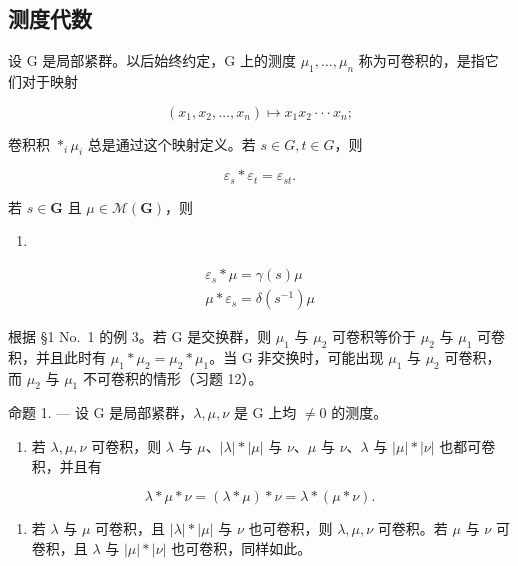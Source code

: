 \subsection{测度代数}

设 G 是局部紧群。以后始终约定，G 上的测度 \(\mu_{1},\ldots,\mu_{n}\) 称为可卷积的，是指它们对于映射

\[
(x _ {1}, x _ {2}, \ldots , x _ {n}) \mapsto x _ {1} x _ {2} \cdot \cdot \cdot x _ {n};
\]

卷积积 \(\ast_{i}\mu_{i}\) 总是通过这个映射定义。若 \(s\in G, t\in G\)，则

\[
\varepsilon_ {s} * \varepsilon_ {t} = \varepsilon_ {s t}.\tag{1}
\]

若 \(s \in \mathbf{G}\) 且 \(\mu \in \mathcal{M}(\mathbf{G})\)，则

\begin{enumerate}
\def\labelenumi{(\arabic{enumi})}
\setcounter{enumi}{1}
\tightlist
\item
\end{enumerate}

\[
\begin{array}{l} \varepsilon_ {s} * \mu = \gamma (s) \mu \\ \mu * \varepsilon_ {s} = \delta (s ^ {- 1}) \mu \end{array}\tag{3}
\]

根据 §1 No.~1 的例 3。若 G 是交换群，则 \(\mu_{1}\) 与 \(\mu_{2}\) 可卷积等价于 \(\mu_{2}\) 与 \(\mu_{1}\) 可卷积，并且此时有 \(\mu_{1} * \mu_{2} = \mu_{2} * \mu_{1}\)。当 G 非交换时，可能出现 \(\mu_{1}\) 与 \(\mu_{2}\) 可卷积，而 \(\mu_{2}\) 与 \(\mu_{1}\) 不可卷积的情形（习题 12）。

命题 1. --- 设 G 是局部紧群，\(\lambda, \mu, \nu\) 是 G 上均 \(\neq 0\) 的测度。

\begin{enumerate}
\def\labelenumi{(\roman{enumi})}
\tightlist
\item
  若 \(\lambda, \mu, \nu\) 可卷积，则 \(\lambda\) 与 \(\mu\)、\(|\lambda| * |\mu|\) 与 \(\nu\)、\(\mu\) 与 \(\nu\)、\(\lambda\) 与 \(|\mu| * |\nu|\) 也都可卷积，并且有
\end{enumerate}

\[
\lambda * \mu * \nu = (\lambda * \mu) * \nu = \lambda * (\mu * \nu).
\]

\begin{enumerate}
\def\labelenumi{(\roman{enumi})}
\setcounter{enumi}{1}
\tightlist
\item
  若 \(\lambda\) 与 \(\mu\) 可卷积，且 \(|\lambda| * |\mu|\) 与 \(\nu\) 也可卷积，则 \(\lambda, \mu, \nu\) 可卷积。若 \(\mu\) 与 \(\nu\) 可卷积，且 \(\lambda\) 与 \(|\mu| * |\nu|\) 也可卷积，同样如此。
\end{enumerate}

